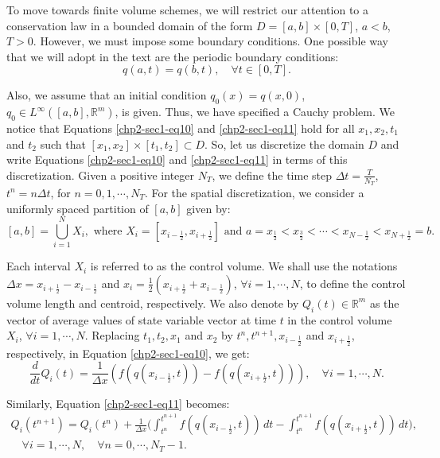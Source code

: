 To move towards finite volume schemes, we will restrict our attention
to a conservation law in a bounded domain of the form 
$D = [a,b]\times[0,T]$, $a<b$, $T>0$. However, we must 
impose some boundary conditions. One possible way that we will adopt 
in the text are the periodic boundary conditions:
\begin{equation}
	\label{chp2-sec1-eq12}
	{q}(a, t) = {q}(b, t),\quad \forall t \in [0, T].
\end{equation}

Also, we assume that an initial condition $q_0(x) = q(x,0)$, $q_0 \in L^{\infty}([a,b],\mathbb{R}^m)$, is given.
Thus, we have specified a Cauchy problem.
We notice that Equations \eqref{chp2-sec1-eq10} and \eqref{chp2-sec1-eq11}
hold for all $x_1, x_2, t_1$ and $t_2$ such that
$[x_1, x_2] \times [t_1, t_2] \subset D$.
So, let us discretize the domain $D$ and write 
Equations \eqref{chp2-sec1-eq10} and \eqref{chp2-sec1-eq11} in terms of this discretization.
Given a positive integer $N_T$, we define the time step 
$\Delta t = \frac{T}{N_T}$, $t^{n} = n \Delta t$, for $n = 0, 1 ,\cdots, N_T$.
For the spatial discretization, we consider a uniformly spaced partition of $[a, b]$ given by: 
\begin{equation}
	\label{chp2-sec1-eq13}
	[a,b] = \bigcup_{i=1}^N X_i, 
	\text{ where } X_i= [x_{i-\frac{1}{2}}, x_{i+\frac{1}{2}}] \text{ and } 
	a = x_{\frac{1}{2}} < x_{\frac{3}{2}} < \cdots < x_{N-\frac{1}{2}} < x_{N+\frac{1}{2}} = b.
\end{equation}

Each interval $X_i$ is referred to as the control volume. 
We shall use the notations $\Delta x = x_{i+\frac{1}{2}} - x_{i-\frac{1}{2}}$ 
and $x_i = \frac{1}{2}(x_{i+\frac{1}{2}} + x_{i-\frac{1}{2}})$, $\forall i = 1, \cdots, N$, 
to define the control volume length and centroid, respectively.
We also denote by ${Q}_i(t) \in \mathbb{R}^m$ as the vector of 
average values of state variable vector at time $t$
in the control volume $X_i$, $\forall i = 1, \cdots, N$. Replacing $t_1, t_2, x_1$ and 
$x_2$ by $t^{n}, t^{n+1}, x_{i-\frac{1}{2}}$ and $x_{i+\frac{1}{2}}$,
respectively, in Equation \eqref{chp2-sec1-eq10}, we get:
\begin{equation}
	\label{chp2-sec1-eq14}
	\frac{d}{dt} {Q}_i(t) = \frac{1}{\Delta x}
	({f}({q}(x_{i-\frac{1}{2}},t)) -
	{f}({q}(x_{i+\frac{1}{2}},t))) ,
	\quad \forall i = 1, \cdots, N.
\end{equation}

Similarly, Equation \eqref{chp2-sec1-eq11} becomes:
\begin{equation}
        \label{chp2-sec1-eq15}
	\begin{aligned}
		{Q}_i(t^{n+1}) =  {Q}_i(t^{n}) +
		\frac{1}{\Delta x}\bigg( \int_{t^{n}}^{t^{n+1}}
        	{f}({q}(x_{i-\frac{1}{2}}, t)) \,dt -
		\int_{t^{n}}^{t^{n+1}}{f}({q}(x_{i+\frac{1}{2}}, t)) \,dt \bigg),
       		\\
		\quad \forall i = 1, \cdots, N,
		\quad \forall n = 0, \cdots, N_T-1.
	\end{aligned}
\end{equation}

